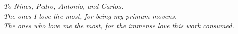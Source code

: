 \vspace*{5cm}
\begin{flushright}
    \itshape
    To Nines, Pedro, Antonio, and Carlos. \\
    The ones I love the most, for being my \textup{primum movens}. \\
    The ones who love me the most, for the immense love this work consumed.
\end{flushright}